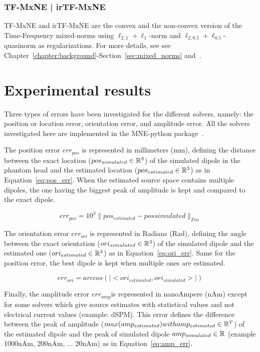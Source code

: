 \subsubsection{TF-MxNE | irTF-MxNE}
\Ac{TF-MxNE} and \ac{irTF-MxNE} are the convex and the non-convex version of the Time-Frequency mixed-norms using $\ell_{2,1}+\ell_1$-norm and $\ell_{2,0.5}+\ell_{0.5}$-quasinorm as regularizations. For more details, see  see Chapter~\ref{chapter:background}-Section~\ref{sec:mixed_norms} and~\cite{TF-MxNE,bekhti2016m}.

\section{Experimental results}
Three types of errors have been investigated for the different solvers, namely: the position or location error, orientation error, and amplitude error. All the solvers investigated here are implemented in the MNE-python package~\cite{mne-python,mne}.

The position error $err_{pos}$ is represented in millimeters (mm), defining the distance between the exact location ($pos_{simulated}\in\mathbb{R}^3$) of the simulated dipole in the phantom head and the estimated location ($pos_{estimated}\in\mathbb{R}^3$) as in Equation~\eqref{eq:pos_err}. When the estimated source space contains multiple dipoles, the one having the biggest peak of amplitude is kept and compared to the exact dipole.

\begin{equation}\label{eq:pos_err}
err_{pos} = 10^3 \|pos_{estimated} - pos{simulated}\|_{Fro}
\end{equation}

The orientation error $err_{ori}$ is represented in Radians (Rad), defining the angle between the exact orientation ($ori_{simulated}\in\mathbb{R}^3$) of the simulated dipole and the estimated one ($ori_{estimated}\in\mathbb{R}^3$) as in Equation~\eqref{eq:ori_err}. Same for the position error, the best dipole is kept when multiple ones are estimated.

\begin{equation}\label{eq:ori_err}
err_{ori} = arccos(|<ori_{estimated}, ori_{simulated}>|)
\end{equation}

Finally, the amplitude error $err_{amp}$is represented in nanoAmpere (nAm) except for some solvers which give source estimates with statistical values and not electrical current values (example: dSPM). This error defines the difference between the peak of amplitude ($max(amp_{estimated}) with amp_{estimated}\in\mathbb{R}^T$) of the estimated dipole and the peak of simulated dipole $amp_{simulated}\in\mathbb{R}$ (example 1000nAm, 200nAm, ... 20nAm) as in Equation~\eqref{eq:amp_err}.

